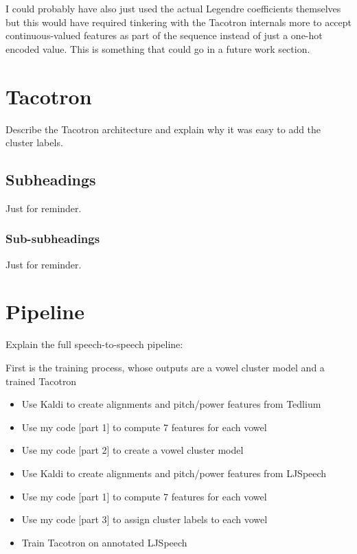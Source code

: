 \documentclass{article}
\begin{document}
I could probably have also just used the actual Legendre coefficients themselves but this would have required tinkering with the Tacotron internals more to accept continuous-valued features as part of the sequence instead of just a one-hot encoded value. This is something that could go in a future work section.

\section{Tacotron}
\label{sec:tacotron}

Describe the Tacotron architecture and explain why it was easy to add the cluster labels.

\subsection{Subheadings}
\label{ssec:subhead}

Just for reminder.

\subsubsection{Sub-subheadings}
\label{sssec:subsubhead}

Just for reminder.

\section{Pipeline}
\label{sec:pipeline}

Explain the full speech-to-speech pipeline:

First is the training process, whose outputs are a vowel cluster model and a trained Tacotron

\begin{itemize}

  \item Use Kaldi to create alignments and pitch/power features from Tedlium
  \item Use my code [part 1] to compute 7 features for each vowel
  \item Use my code [part 2] to create a vowel cluster model
  \item Use Kaldi to create alignments and pitch/power features from LJSpeech
  \item Use my code [part 1] to compute 7 features for each vowel
  \item Use my code [part 3] to assign cluster labels to each vowel
  \item Train Tacotron on annotated LJSpeech

\end{itemize}
\end{document}
